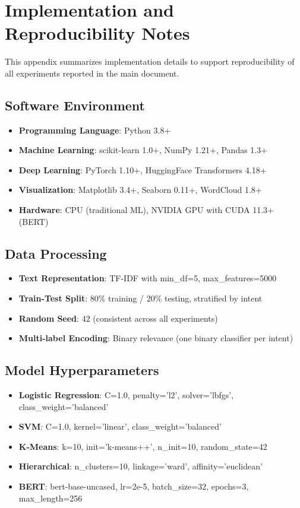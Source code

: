 \documentclass[acmlarge,screen,nonacm]{acmart}
\begin{document}
\FloatBarrier
\section{Implementation and Reproducibility Notes}

This appendix summarizes implementation details to support reproducibility of all
experiments reported in the main document.

\subsection{Software Environment}
\begin{itemize}
  \item \textbf{Programming Language}: Python 3.8+
  \item \textbf{Machine Learning}: scikit-learn 1.0+, NumPy 1.21+, Pandas 1.3+
  \item \textbf{Deep Learning}: PyTorch 1.10+, HuggingFace Transformers 4.18+
  \item \textbf{Visualization}: Matplotlib 3.4+, Seaborn 0.11+, WordCloud 1.8+
  \item \textbf{Hardware}: CPU (traditional ML), NVIDIA GPU with CUDA 11.3+ (BERT)
\end{itemize}

\subsection{Data Processing}
\begin{itemize}
  \item \textbf{Text Representation}: TF-IDF with min\_df=5, max\_features=5000
  \item \textbf{Train-Test Split}: 80\% training / 20\% testing, stratified by intent
  \item \textbf{Random Seed}: 42 (consistent across all experiments)
  \item \textbf{Multi-label Encoding}: Binary relevance (one binary classifier per intent)
\end{itemize}

\subsection{Model Hyperparameters}
\begin{itemize}
  \item \textbf{Logistic Regression}: C=1.0, penalty='l2', solver='lbfgs', class\_weight='balanced'
  \item \textbf{SVM}: C=1.0, kernel='linear', class\_weight='balanced'
  \item \textbf{K-Means}: k=10, init='k-means++', n\_init=10, random\_state=42
  \item \textbf{Hierarchical}: n\_clusters=10, linkage='ward', affinity='euclidean'
  \item \textbf{BERT}: bert-base-uncased, lr=2e-5, batch\_size=32, epochs=3, max\_length=256
\end{itemize}
\end{document}
